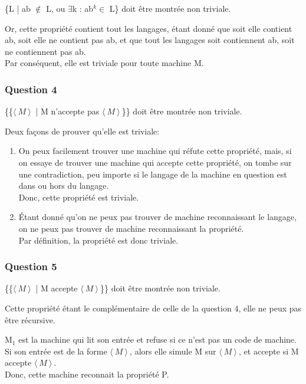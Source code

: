 \{L | ab $\not\in$ L, ou $\exists$k :
ab$^k\in$ L\} doit \^etre montr\'ee
non triviale.

Or, cette propri\'et\'e contient tout
les langages, \'etant donn\'e
que soit elle contient ab, soit elle ne
contient pas ab, et que tout les langages
soit contiennent ab, soit ne contiennent
pas ab.\\
Par cons\'equent, elle est triviale
pour toute machine M.

\subsubsection{Question 4}
\{\{$\langle\ M\ \rangle \!\ $
| M n'accepte pas
$\langle\ M\ \rangle \!\ $\}\}
doit \^etre montr\'ee non triviale.

Deux fa\c{c}ons de prouver qu'elle est triviale:
\begin{enumerate}
  \item On peux facilement trouver une machine
qui r\'efute cette propri\'et\'e, mais,
si on essaye de trouver une machine
qui accepte cette propri\'et\'e,
on tombe sur une contradiction,
peu importe si le langage de la machine
en question est dans ou hors du langage.\\
Donc, cette propri\'et\'e est triviale.
  \item \'Etant donn\'e qu'on ne peux pas trouver de machine
reconnaissant le langage, on ne peux pas trouver de
machine reconnaissant la propri\'et\'e.\\
Par d\'efinition, la propri\'et\'e est donc triviale.
\end{enumerate}

\subsubsection{Question 5}
\{\{$\langle\ M\ \rangle \!\ $
| M accepte $\langle\ M\ \rangle \!\ $\}\}
doit \^etre montr\'ee non triviale.

Cette propri\'et\'e \'etant le compl\'ementaire de
celle de la question 4, elle ne peux pas \^etre
r\'ecursive.

M$_1$ est la machine qui lit son entr\'ee et refuse si
ce n'est pas un code de machine.\\
Si son entr\'ee est de la forme  $\langle\ M\ \rangle \!\ $,
alors elle simule M sur $\langle\ M\ \rangle \!\ $, et
accepte si M accepte $\langle\ M\ \rangle \!\ $.\\
Donc, cette machine reconnait la propri\'et\'e P.

